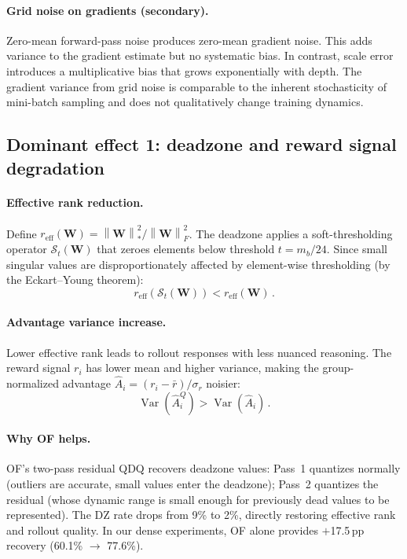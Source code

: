 \documentclass{article}
\theoremstyle{definition}
\theoremstyle{remark}
\DeclareMathOperator{\Var}{Var}
\newcommand{\cS}{\mathcal{S}}
\newcommand{\bW}{\bm{W}}
\newcommand{\norm}[1]{\left\|#1\right\|}
\begin{document}
\paragraph{Grid noise on gradients (secondary).}
Zero-mean forward-pass noise produces zero-mean gradient noise. This adds variance to the gradient estimate but no systematic bias. In contrast, scale error introduces a multiplicative bias that grows exponentially with depth. The gradient variance from grid noise is comparable to the inherent stochasticity of mini-batch sampling and does not qualitatively change training dynamics.

\subsection{Dominant effect 1: deadzone and reward signal degradation}

\paragraph{Effective rank reduction.}
Define $r_{\mathrm{eff}}(\bW) = \norm{\bW}_*^2/\norm{\bW}_F^2$. The deadzone applies a soft-thresholding operator $\cS_t(\bW)$ that zeroes elements below threshold $t = m_b/24$. Since small singular values are disproportionately affected by element-wise thresholding (by the Eckart--Young theorem):
\begin{equation}
  r_{\mathrm{eff}}(\cS_t(\bW)) < r_{\mathrm{eff}}(\bW)\,.
\end{equation}

\paragraph{Advantage variance increase.}
Lower effective rank leads to rollout responses with less nuanced reasoning. The reward signal $r_i$ has lower mean and higher variance, making the group-normalized advantage $\hat{A}_i = (r_i - \bar{r})/\sigma_r$ noisier:
\begin{equation}
  \Var(\hat{A}_i^Q) > \Var(\hat{A}_i)\,.
\end{equation}

\paragraph{Why OF helps.}
OF's two-pass residual QDQ recovers deadzone values: Pass~1 quantizes normally (outliers are accurate, small values enter the deadzone); Pass~2 quantizes the residual (whose dynamic range is small enough for previously dead values to be represented). The DZ rate drops from 9\% to 2\%, directly restoring effective rank and rollout quality. In our dense experiments, OF alone provides $+$17.5\,pp recovery (60.1\% $\to$ 77.6\%).
\end{document}
